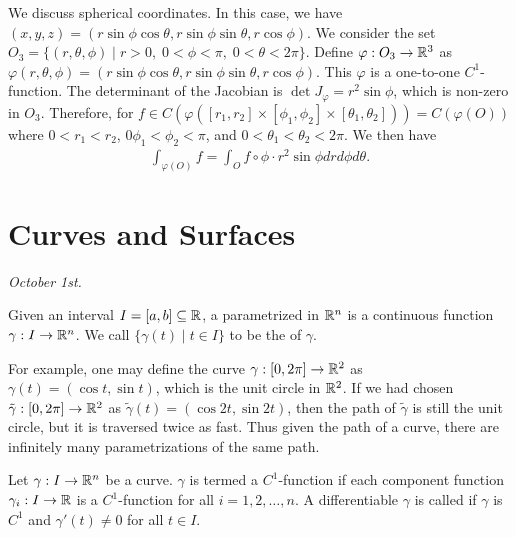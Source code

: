 \begin{example}
    We discuss spherical coordinates. In this case, we have $(x,y,z) = (r\sin\phi \cos \theta, r \sin \phi \sin \theta, r \cos \phi)$. We consider the set $O_{3} = \{(r,\theta,\phi) \mid r > 0,\; 0 < \phi < \pi,\;0 < \theta < 2\pi\}$. Define $\varphi:O_{3} \to \mathbb{R}^{3}$ as $\varphi(r,\theta,\phi) = (r\sin\phi \cos \theta, r \sin \phi \sin \theta, r \cos \phi)$. This $\varphi$ is a one-to-one $C^{1}$-function. The determinant of the Jacobian is $\det J_{\varphi} = r^{2} \sin \phi$, which is non-zero in $O_{3}$. Therefore, for $f \in C(\varphi([r_{1},r_{2}] \times [\phi_{1},\phi_{2}] \times [\theta_{1},\theta_{2}])) = C(\varphi(O))$ where $0 < r_{1} < r_{2}$, $0 \phi_{1} < \phi_{2} < \pi$, and $0 < \theta_{1} < \theta_{2} < 2\pi$. We then have
    \begin{align}
        \int_{\varphi(O)} f = \int_{O} f \circ \phi \cdot r^{2} \sin \phi dr d\phi d\theta.
    \end{align}
\end{example}

\section{Curves and Surfaces}

\textit{October 1st.}

\begin{definition}
    Given an interval $I = [a,b] \subseteq \mathbb{R}$, a parametrized  in $\mathbb{R}^{n}$ is a continuous function $\gamma:I \to \mathbb{R}^{n}$. We call $\{\gamma(t) \mid t \in I\}$ to be the  of $\gamma$.
\end{definition}

For example, one may define the curve $\gamma:[0,2\pi] \to \mathbb{R}^{2}$ as $\gamma(t) = (\cos t, \sin t)$, which is the unit circle in $\mathbb{R}^{2}$. If we had chosen $\tilde{\gamma}:[0,2\pi] \to \mathbb{R}^{2}$ as $\tilde{\gamma}(t) = (\cos 2t, \sin 2t)$, then the path of $\tilde{\gamma}$ is still the unit circle, but it is traversed twice as fast. Thus given the path of a curve, there are infinitely many parametrizations of the same path.

\begin{definition}
    Let $\gamma:I \to \mathbb{R}^{n}$ be a curve. $\gamma$ is termed a $C^{1}$-function if each component function $\gamma_{i}:I \to \mathbb{R}$ is a $C^{1}$-function for all $i = 1,2,\ldots,n$. A differentiable $\gamma$ is called  if $\gamma$ is $C^{1}$ and $\gamma'(t) \neq 0$ for all $t \in I$.
\end{definition}

